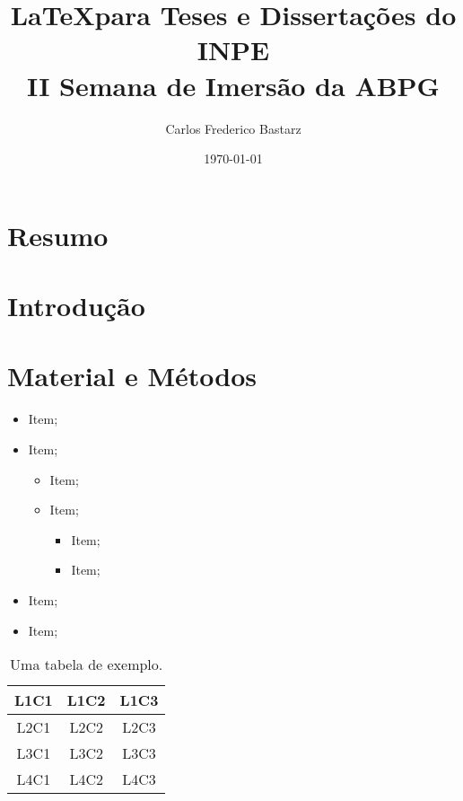 \documentclass[10pt]{article}
\title{\LaTeX para Teses e Dissertações do INPE \\ II Semana de Imersão da ABPG}
\author{Carlos Frederico Bastarz}
\date{\today}
\begin{document}
\setlength{\parindent}{3em} %
\setlength{\parskip}{1em} %

\maketitle


\section*{Resumo}

\lipsum[1]

\section{Introdução}

\lipsum[2-3]

\section{Material e Métodos}

\lipsum[4]

\begin{itemize}
    \item Item;
    \item Item;
    \begin{itemize}
        \item Item;
        \item Item;
        \begin{itemize}
            \item Item;
            \item Item;
        \end{itemize}
    \end{itemize}
    \item Item;
    \item Item;
\end{itemize}

\lipsum[5]

\begin{table}[h]
    \label{tab:my_table}
    \centering
    \caption{Uma tabela de exemplo.}
    \begin{tabular}{c|c|c}
        \toprule
        \textbf{L1C1} & \textbf{L1C2} & \textbf{L1C3} \\
        \midrule
        L2C1          & L2C2          & L2C3 \\
        L3C1          & L3C2          & L3C3 \\
        L4C1          & L4C2          & L4C3 \\
        \bottomrule
    \end{tabular}
\end{table}
\end{document}
